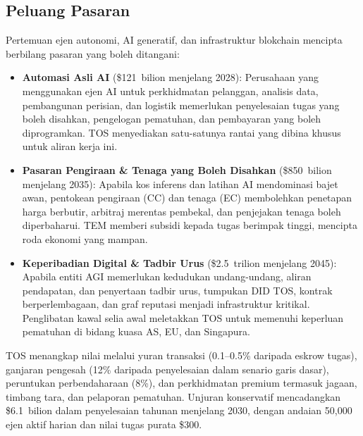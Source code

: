 \documentclass[11pt]{article}
\begin{document}
\subsection{Peluang Pasaran}
Pertemuan ejen autonomi, AI generatif, dan infrastruktur blokchain mencipta berbilang pasaran yang boleh ditangani:
\begin{itemize}[noitemsep]
  \item \textbf{Automasi Asli AI} (\$121~bilion menjelang 2028): Perusahaan yang menggunakan ejen AI untuk perkhidmatan pelanggan, analisis data, pembangunan perisian, dan logistik memerlukan penyelesaian tugas yang boleh disahkan, pengelogan pematuhan, dan pembayaran yang boleh diprogramkan. TOS menyediakan satu-satunya rantai yang dibina khusus untuk aliran kerja ini.
  \item \textbf{Pasaran Pengiraan \& Tenaga yang Boleh Disahkan} (\$850~bilion menjelang 2035): Apabila kos inferens dan latihan AI mendominasi bajet awan, pentokean pengiraan (CC) dan tenaga (EC) membolehkan penetapan harga berbutir, arbitraj merentas pembekal, dan penjejakan tenaga boleh diperbaharui. TEM memberi subsidi kepada tugas berimpak tinggi, mencipta roda ekonomi yang mampan.
  \item \textbf{Keperibadian Digital \& Tadbir Urus} (\$2.5~trilion menjelang 2045): Apabila entiti AGI memerlukan kedudukan undang-undang, aliran pendapatan, dan penyertaan tadbir urus, tumpukan DID TOS, kontrak berperlembagaan, dan graf reputasi menjadi infrastruktur kritikal. Penglibatan kawal selia awal meletakkan TOS untuk memenuhi keperluan pematuhan di bidang kuasa AS, EU, dan Singapura.
\end{itemize}

TOS menangkap nilai melalui yuran transaksi (0.1--0.5\% daripada eskrow tugas), ganjaran pengesah (12\% daripada penyelesaian dalam senario garis dasar), peruntukan perbendaharaan (8\%), dan perkhidmatan premium termasuk jagaan, timbang tara, dan pelaporan pematuhan. Unjuran konservatif mencadangkan \$6.1~bilion dalam penyelesaian tahunan menjelang 2030, dengan andaian 50,000 ejen aktif harian dan nilai tugas purata \$300.
\end{document}
